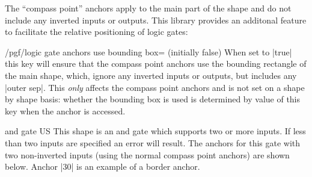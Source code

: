 The ``compass point'' anchors apply to the main part of the shape
and do not include any inverted inputs or outputs. This library
provides an additonal feature to facilitate the relative positioning
of logic gates:

\begin{key}{/pgf/logic gate anchors use bounding box= (initially false)}
When set to |true| this key will ensure that the 
compass point anchors use the bounding rectangle of the
main shape, which, ignore any inverted inputs or outputs, but
includes any |outer sep|. 
This \emph{only} affects the compass point anchors
and is not set on a shape by shape basis: whether the bounding
box is used is determined by value of this key when the anchor
is accessed.

\begin{codeexample}[]
\end{codeexample} 



\end{key}




\begin{shape}{and gate US}
  This shape is an and gate which supports two or more inputs. If
	less than two inputs are specified an error will result. 
	The anchors for this gate with two
  non-inverted inputs (using the normal compass point anchors) are
  shown below. Anchor |30| is an example of a border anchor.
  
\begin{codeexample}[]
\Huge
{}
\end{codeexample}
\end{shape}

